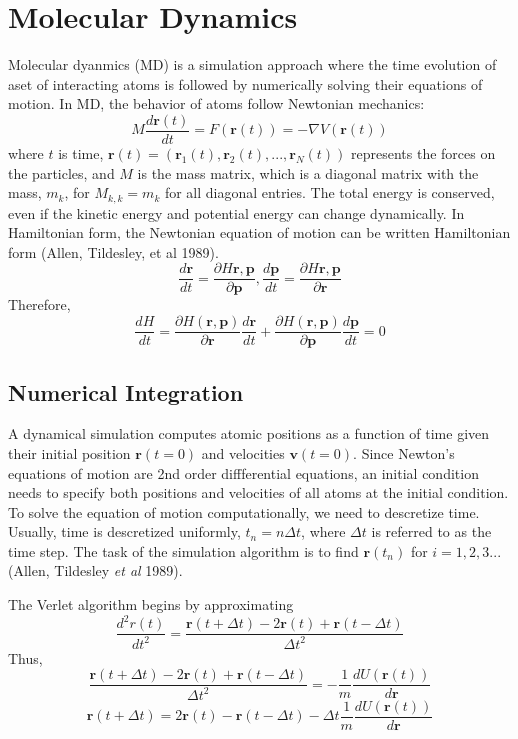 \section{Molecular Dynamics}
Molecular dyanmics (MD) is a simulation approach where the time evolution of aset of interacting atoms is followed by numerically solving their equations of motion.  In MD, the behavior of atoms follow Newtonian mechanics:
\begin{equation}
    M\frac{d\bm{r}(t)}{dt} = F(\bm{r}(t))=-\nabla V(\bm{r}(t))
\end{equation}
where $t$ is time, $\bm{r}(t) = (\bm{r}_1(t),\bm{r}_2(t),...,\bm{r}_N(t))$ represents the forces on the particles, and $M$ is the mass matrix, which is a diagonal matrix with the mass, $m_k$, for $M_{k,k}=m_k$ for all diagonal entries.
The total energy is conserved, even if the kinetic energy and potential energy can change dynamically.  In Hamiltonian form, the Newtonian equation of motion can be written Hamiltonian form (Allen, Tildesley, et al 1989).
\begin{equation}
	\frac{d \bm{r}}{dt}=\frac{\partial H{\bm{r},\bm{p}}}{\partial \bm{p}},
	\frac{d \bm{p}}{dt}=\frac{\partial H{\bm{r},\bm{p}}}{\partial \bm{r}}
\end{equation}
Therefore,
\begin{equation}
	\frac{dH}{dt}=\frac{\partial H(\bm{r},\bm{p})}{\partial \bm{r}} \frac{d\bm{r}}{dt}
						   +\frac{\partial H(\bm{r},\bm{p})}{\partial \bm{p}} \frac{d\bm{p}}{dt} = 0
\end{equation}

\subsection{Numerical Integration}
A dynamical simulation computes atomic positions as a function of time given their initial position $\bm{r}(t=0)$ and velocities $\bm{v}(t=0)$.  Since Newton's equations of motion are 2nd order diffferential equations, an initial condition needs to specify both positions and velocities of all atoms at the initial condition.  To solve the equation of motion computationally, we need to descretize time.  Usually, time is descretized uniformly, $t_n=n\Delta t$, where $\Delta t$ is referred to as the time step.  The task of the simulation algorithm is to find $\bm{r}(t_n)$ for $i=1,2,3...$ (Allen, Tildesley \emph{et al} 1989).

The Verlet algorithm begins by approximating
\begin{equation}
	\frac{d^2 r(t)}
	     {dt^2}
	= \frac{\bm{r}(t+\Delta t) - 2\bm{r}(t) + \bm{r}(t-\Delta t)}
	       {\Delta t^2}
\end{equation}
Thus,
\begin{equation}
  \frac{\bm{r}(t+\Delta t) - 2\bm{r}(t) + \bm{r}(t-\Delta t)}
	     {\Delta t^2}
	=
	- \frac{1}{m} \frac{dU(\bm{r}(t))}{d\bm{r}}
\end{equation}
\begin{equation}
	\bm{r}(t+\Delta t)
	     = 2\bm{r}(t) - \bm{r}(t-\Delta t) - \Delta t \frac{1}{m} \frac{dU(\bm{r}(t))}{d\bm{r}}
\end{equation}


